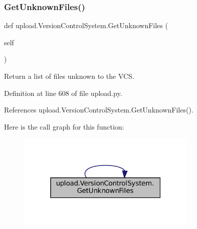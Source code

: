 \subsubsection{\texorpdfstring{Get\+Unknown\+Files()}{GetUnknownFiles()}\hspace{0.1cm}{\footnotesize\ttfamily [1/2]}}
{\footnotesize\ttfamily def upload.\+Version\+Control\+System.\+Get\+Unknown\+Files (\begin{DoxyParamCaption}\item[{}]{self }\end{DoxyParamCaption})}

\begin{DoxyVerb}Return a list of files unknown to the VCS.\end{DoxyVerb}
 

Definition at line 608 of file upload.\+py.



References upload.\+Version\+Control\+System.\+Get\+Unknown\+Files().


Here is the call graph for this function\+:
\nopagebreak
\begin{figure}[H]
\begin{center}
\leavevmode
\includegraphics[width=244pt]{classupload_1_1VersionControlSystem_a56a60e56aa9aff3df4001d2f84cab884_cgraph}
\end{center}
\end{figure}
\mbox{\label{classupload_1_1VersionControlSystem_a56a60e56aa9aff3df4001d2f84cab884}} 
